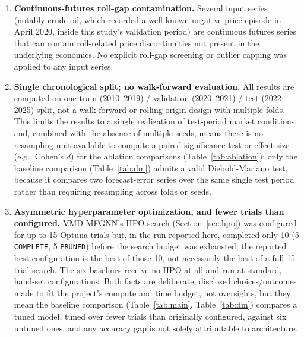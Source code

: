 \documentclass[journal]{IEEEtran}
\begin{document}
\begin{enumerate}
    \item \textbf{Continuous-futures roll-gap contamination.} Several input series (notably crude oil, which recorded a well-known negative-price episode in April 2020, inside this study's validation period) are continuous futures series that can contain roll-related price discontinuities not present in the underlying economics. No explicit roll-gap screening or outlier capping was applied to any input series.
    \item \textbf{Single chronological split; no walk-forward evaluation.} All results are computed on one train (2010--2019) / validation (2020--2021) / test (2022--2025) split, not a walk-forward or rolling-origin design with multiple folds. This limits the results to a single realization of test-period market conditions, and, combined with the absence of multiple seeds, means there is no resampling unit available to compute a paired significance test or effect size (e.g., Cohen's $d$) for the ablation comparisons (Table~\ref{tab:ablation}); only the baseline comparison (Table~\ref{tab:dm}) admits a valid Diebold-Mariano test, because it compares two forecast-error series over the same single test period rather than requiring resampling across folds or seeds.
    \item \textbf{Asymmetric hyperparameter optimization, and fewer trials than configured.} VMD-MFGNN's HPO search (Section~\ref{sec:hpo}) was configured for up to 15 Optuna trials but, in the run reported here, completed only 10 (5 \texttt{COMPLETE}, 5 \texttt{PRUNED}) before the search budget was exhausted; the reported best configuration is the best of those 10, not necessarily the best of a full 15-trial search. The six baselines receive no HPO at all and run at standard, hand-set configurations. Both facts are deliberate, disclosed choices/outcomes made to fit the project's compute and time budget, not oversights, but they mean the baseline comparison (Table~\ref{tab:main}, Table~\ref{tab:dm}) compares a tuned model, tuned over fewer trials than originally configured, against six untuned ones, and any accuracy gap is not solely attributable to architecture.

\end{enumerate}
\end{document}
